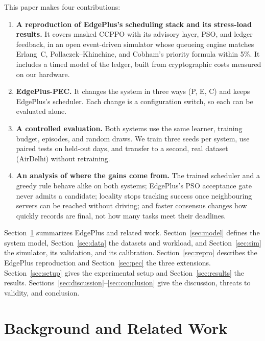 \documentclass[11pt,journal,onecolumn]{IEEEtran}
\begin{document}
This paper makes four contributions:
\begin{enumerate}
\item \textbf{A reproduction of EdgePlus's scheduling stack and its stress-load results.} It covers masked CCPPO with its advisory layer, PSO, and ledger feedback, in an open event-driven simulator whose queueing engine matches Erlang~C, Pollaczek--Khinchine, and Cobham's priority formula within 5\%. It includes a timed model of the ledger, built from cryptographic costs measured on our hardware.
\item \textbf{EdgePlus-PEC.} It changes the system in three ways (P, E, C) and keeps EdgePlus's scheduler. Each change is a configuration switch, so each can be evaluated alone.
\item \textbf{A controlled evaluation.} Both systems use the same learner, training budget, episodes, and random draws. We train three seeds per system, use paired tests on held-out days, and transfer to a second, real dataset (AirDelhi) without retraining.
\item \textbf{An analysis of where the gains come from.} The trained scheduler and a greedy rule behave alike on both systems; EdgePlus's PSO acceptance gate never admits a candidate; locality stops tracking success once neighbouring servers can be reached without driving; and faster consensus changes how quickly records are final, not how many tasks meet their deadlines.
\end{enumerate}

Section~\ref{sec:background} summarizes EdgePlus and related work. Section~\ref{sec:model} defines the system model, Section~\ref{sec:data} the datasets and workload, and Section~\ref{sec:sim} the simulator, its validation, and its calibration. Section~\ref{sec:repro} describes the EdgePlus reproduction and Section~\ref{sec:pec} the three extensions. Section~\ref{sec:setup} gives the experimental setup and Section~\ref{sec:results} the results. Sections~\ref{sec:discussion}--\ref{sec:conclusion} give the discussion, threats to validity, and conclusion.

\section{Background and Related Work}
\label{sec:background}
\end{document}
